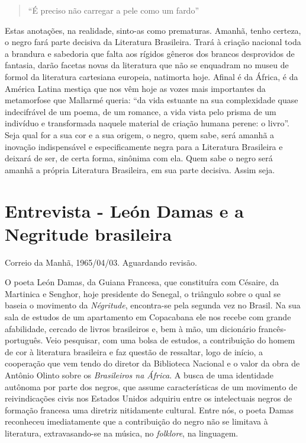 \documentclass[
  letterpaper,
  DIV=11,
  numbers=noendperiod]{scrreprt}
\begin{document}
\begin{quote}
``É preciso não carregar a pele como um fardo''
\end{quote}

Estas anotações, na realidade, sinto-as como prematuras. Amanhã, tenho
certeza, o negro fará parte decisiva da Literatura Brasileira. Trará à
criação nacional toda a brandura e sabedoria que falta aos rígidos
gêneros dos brancos desprovidos de fantasia, darão facetas novas da
literatura que não se enquadram no museu de formol da literatura
cartesiana europeia, natimorta hoje. Afinal é da África, é da América
Latina mestiça que nos vêm hoje as vozes mais importantes da metamorfose
que Mallarmé queria: ``da vida estuante na sua complexidade quase
indecifrável de um poema, de um romance, a vida vista pelo prisma de um
indivíduo e transformada naquele material de criação humana perene: o
livro''. Seja qual for a sua cor e a sua origem, o negro, quem sabe,
será amanhã a inovação indispensável e especificamente negra para a
Literatura Brasileira e deixará de ser, de certa forma, sinônima com
ela. Quem sabe o negro será amanhã a própria Literatura Brasileira, em
sua parte decisiva. Assim seja.

\chapter{Entrevista - León Damas e a Negritude
brasileira}\label{entrevista---leuxf3n-damas-e-a-negritude-brasileira}

Correio da Manhã, 1965/04/03. Aguardando revisão.

\hfill\break

O poeta León Damas, da Guiana Francesa, que constituíra com Césaire, da
Martinica e Senghor, hoje presidente do Senegal, o triângulo sobre o
qual se baseia o movimento da \emph{Négritude}, encontra-se pela segunda
vez no Brasil. Na sua sala de estudos de um apartamento em Copacabana
ele nos recebe com grande afabilidade, cercado de livros brasileiros e,
bem à mão, um dicionário francês-português. Veio pesquisar, com uma
bolsa de estudos, a contribuição do homem de cor à literatura brasileira
e faz questão de ressaltar, logo de início, a cooperação que vem tendo
do diretor da Biblioteca Nacional e o valor da obra de Antônio Olinto
sobre os \emph{Brasileiros na África}. A busca de uma identidade
autônoma por parte dos negros, que assume características de um
movimento de reivindicações civis nos Estados Unidos adquiriu entre os
intelectuais negros de formação francesa uma diretriz nitidamente
cultural. Entre nós, o poeta Damas reconheceu imediatamente que a
contribuição do negro não se limitava à literatura, extravasando-se na
música, no \emph{folklore}, na linguagem.
\end{document}
